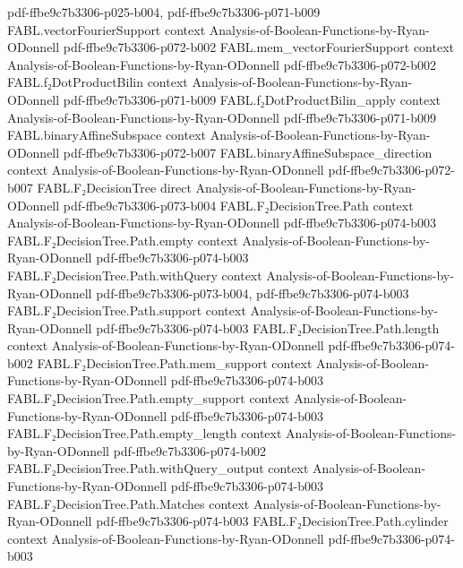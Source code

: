 \begin{theorem}
  {pdf-ffbe9c7b3306-p025-b004,
    pdf-ffbe9c7b3306-p071-b009}
\proofstep
  {FABL.vectorFourierSupport}
  {context}
  {Analysis-of-Boolean-Functions-by-Ryan-ODonnell}
  {pdf-ffbe9c7b3306-p072-b002}
\proofstep
  {FABL.mem_vectorFourierSupport}
  {context}
  {Analysis-of-Boolean-Functions-by-Ryan-ODonnell}
  {pdf-ffbe9c7b3306-p072-b002}
\proofstep
  {FABL.f₂DotProductBilin}
  {context}
  {Analysis-of-Boolean-Functions-by-Ryan-ODonnell}
  {pdf-ffbe9c7b3306-p071-b009}
\proofstep
  {FABL.f₂DotProductBilin_apply}
  {context}
  {Analysis-of-Boolean-Functions-by-Ryan-ODonnell}
  {pdf-ffbe9c7b3306-p071-b009}
\proofstep
  {FABL.binaryAffineSubspace}
  {context}
  {Analysis-of-Boolean-Functions-by-Ryan-ODonnell}
  {pdf-ffbe9c7b3306-p072-b007}
\proofstep
  {FABL.binaryAffineSubspace_direction}
  {context}
  {Analysis-of-Boolean-Functions-by-Ryan-ODonnell}
  {pdf-ffbe9c7b3306-p072-b007}
\proofstep
  {FABL.F₂DecisionTree}
  {direct}
  {Analysis-of-Boolean-Functions-by-Ryan-ODonnell}
  {pdf-ffbe9c7b3306-p073-b004}
\proofstep
  {FABL.F₂DecisionTree.Path}
  {context}
  {Analysis-of-Boolean-Functions-by-Ryan-ODonnell}
  {pdf-ffbe9c7b3306-p074-b003}
\proofstep
  {FABL.F₂DecisionTree.Path.empty}
  {context}
  {Analysis-of-Boolean-Functions-by-Ryan-ODonnell}
  {pdf-ffbe9c7b3306-p074-b003}
\proofstep
  {FABL.F₂DecisionTree.Path.withQuery}
  {context}
  {Analysis-of-Boolean-Functions-by-Ryan-ODonnell}
  {pdf-ffbe9c7b3306-p073-b004,
    pdf-ffbe9c7b3306-p074-b003}
\proofstep
  {FABL.F₂DecisionTree.Path.support}
  {context}
  {Analysis-of-Boolean-Functions-by-Ryan-ODonnell}
  {pdf-ffbe9c7b3306-p074-b003}
\proofstep
  {FABL.F₂DecisionTree.Path.length}
  {context}
  {Analysis-of-Boolean-Functions-by-Ryan-ODonnell}
  {pdf-ffbe9c7b3306-p074-b002}
\proofstep
  {FABL.F₂DecisionTree.Path.mem_support}
  {context}
  {Analysis-of-Boolean-Functions-by-Ryan-ODonnell}
  {pdf-ffbe9c7b3306-p074-b003}
\proofstep
  {FABL.F₂DecisionTree.Path.empty_support}
  {context}
  {Analysis-of-Boolean-Functions-by-Ryan-ODonnell}
  {pdf-ffbe9c7b3306-p074-b003}
\proofstep
  {FABL.F₂DecisionTree.Path.empty_length}
  {context}
  {Analysis-of-Boolean-Functions-by-Ryan-ODonnell}
  {pdf-ffbe9c7b3306-p074-b002}
\proofstep
  {FABL.F₂DecisionTree.Path.withQuery_output}
  {context}
  {Analysis-of-Boolean-Functions-by-Ryan-ODonnell}
  {pdf-ffbe9c7b3306-p074-b003}
\proofstep
  {FABL.F₂DecisionTree.Path.Matches}
  {context}
  {Analysis-of-Boolean-Functions-by-Ryan-ODonnell}
  {pdf-ffbe9c7b3306-p074-b003}
\proofstep
  {FABL.F₂DecisionTree.Path.cylinder}
  {context}
  {Analysis-of-Boolean-Functions-by-Ryan-ODonnell}
  {pdf-ffbe9c7b3306-p074-b003}

\end{theorem}
